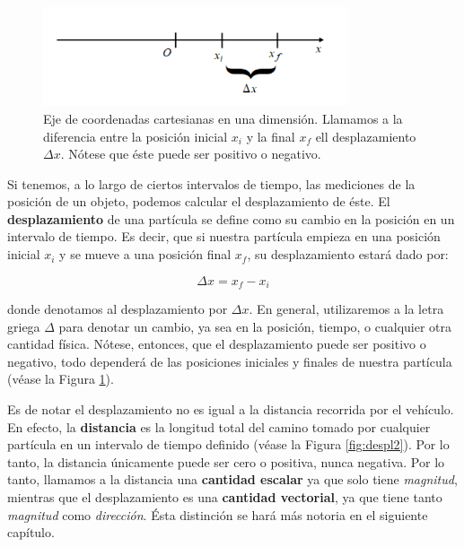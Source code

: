 \begin{figure}[ht]
\centering
  \includegraphics[width=0.8\textwidth]{lecture2/ejex.png}
\caption{Eje de coordenadas cartesianas en una dimensi\'on. Llamamos a la diferencia entre la posici\'on inicial $x_{i}$ y la final $x_{f}$ ell desplazamiento $\Delta x$. N\'otese que \'este puede ser positivo o negativo.}
\label{fig:cart2}
\end{figure}

Si tenemos, a lo largo de ciertos intervalos de tiempo, las mediciones de la posici\'on de un objeto, podemos calcular el desplazamiento de \'este. El \textbf{desplazamiento} de una part\'icula se define como su cambio en la posici\'on en un intervalo de tiempo. Es decir, que si nuestra part\'icula empieza en una posici\'on inicial $x_{i}$ y se mueve a una posici\'on final $x_{f}$, su desplazamiento estar\'a dado por:

\begin{equation}\label{eq:desplazamiento}
    \Delta x = x_{f} - x_{i}
\end{equation}

donde denotamos al desplazamiento por $\Delta x$. En general, utilizaremos a la letra griega $\Delta$ para denotar un cambio, ya sea en la posici\'on, tiempo, o cualquier otra cantidad f\'isica. N\'otese, entonces, que el desplazamiento puede ser positivo o negativo, todo depender\'a de las posiciones iniciales y finales de nuestra part\'icula (v\'ease la Figura \ref{fig:cart2}).

Es de notar el desplazamiento no es igual a la distancia recorrida por el veh\'iculo. En efecto, la \textbf{distancia} es la longitud total del camino tomado por cualquier part\'icula en un intervalo de tiempo definido (v\'ease la Figura \ref{fig:despl2}). Por lo tanto, la distancia \'unicamente puede ser cero o positiva, nunca negativa. Por lo tanto, llamamos a la distancia una \textbf{cantidad escalar} ya que solo tiene \emph{magnitud}, mientras que el desplazamiento es una \textbf{cantidad vectorial}, ya que tiene tanto \emph{magnitud} como \emph{direcci\'on}. \'Esta distinci\'on se har\'a m\'as notoria en el siguiente cap\'itulo.

